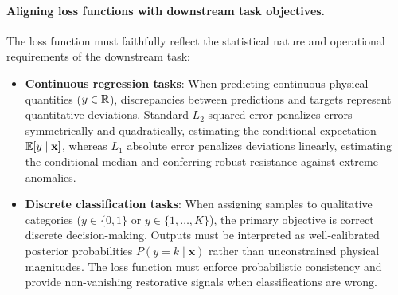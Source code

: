 \paragraph{Aligning loss functions with downstream task objectives.}
The loss function must faithfully reflect the statistical nature and operational requirements of the downstream task:
\begin{itemize}[noitemsep,topsep=2pt,parsep=0pt,partopsep=0pt]
  \item \textbf{Continuous regression tasks}: When predicting continuous physical quantities ($y \in \mathbb{R}$), discrepancies between predictions and targets represent quantitative deviations. Standard $L_2$ squared error penalizes errors symmetrically and quadratically, estimating the conditional expectation $\mathbb{E}[y \mid \mathbf{x}]$, whereas $L_1$ absolute error penalizes deviations linearly, estimating the conditional median and conferring robust resistance against extreme anomalies.
  \item \textbf{Discrete classification tasks}: When assigning samples to qualitative categories ($y \in \{0, 1\}$ or $y \in \{1, \dots, K\}$), the primary objective is correct discrete decision-making. Outputs must be interpreted as well-calibrated posterior probabilities $P(y = k \mid \mathbf{x})$ rather than unconstrained physical magnitudes. The loss function must enforce probabilistic consistency and provide non-vanishing restorative signals when classifications are wrong.
\end{itemize}

